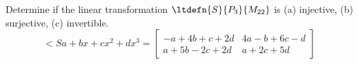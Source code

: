Determine if the linear transformation $\ltdefn{S}{P_3}{M_{22}}$ is (a) injective, (b) surjective, (c) invertible.
\begin{equation*}
\lt{S}{a+bx+cx^2+dx^3}=
\begin{bmatrix}
-a+4b+c+2d & 4a-b+6c-d\\
a+5b-2c+2d & a+2c+5d
\end{bmatrix}
\end{equation*}